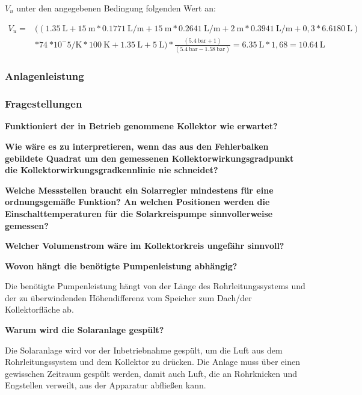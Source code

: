$V_u$ unter den angegebenen Bedingung folgenden Wert an:


\begin{equation}
	\label{MAG-Ber.}
	\begin{aligned}
	V_u= {} &((\SI{1,35}{\liter}+\SI{15}{\metre}*\SI{0,1771}{\liter\per\metre}+\SI{15}{\metre}*\SI{0,2641}{\liter\per\metre}+\SI{2}{\metre}*\SI{0,3941}{\liter\per\metre}+ 0,3*\SI{6,6180}{\liter})\\ &*\SI{74}{*10^-5\per\kelvin}*\SI{100}{\kelvin} + \SI{1,35}{\liter} + \SI{5}{\liter}) *\frac{(\SI{5,4}{\bar} + 1)}{(\SI{5,4}{\bar}-\SI{1,58}{\bar})}= \SI{6,35}{\liter} * 1,68 = \SI{10,64}{\liter}
	\end{aligned}
\end{equation}

\subsubsection{Anlagenleistung}

\subsubsection{Fragestellungen}

\textbf{Funktioniert der in Betrieb genommene Kollektor wie erwartet?}

\textbf{Wie wäre es zu interpretieren, wenn das aus den Fehlerbalken gebildete Quadrat
	um den gemessenen Kollektorwirkungsgradpunkt die Kollektorwirkungsgradkennlinie nie
	schneidet?}

\textbf{Welche Messstellen braucht ein Solarregler mindestens für eine ordnungsgemäße
	Funktion? An welchen Positionen werden die Einschalttemperaturen für die Solarkreispumpe
	sinnvollerweise gemessen?}

\textbf{Welcher Volumenstrom wäre im Kollektorkreis ungefähr sinnvoll?}

\textbf{Wovon hängt die benötigte Pumpenleistung abhängig?}

Die benötigte Pumpenleistung hängt von der Länge des Rohrleitungssystems und der zu überwindenden Höhendifferenz vom Speicher zum Dach/der Kollektorfläche ab. 

\textbf{Warum wird die Solaranlage gespült?}

Die Solaranlage wird vor der Inbetriebnahme gespült, um die Luft aus dem Rohrleitungssystem und dem Kollektor zu drücken. Die Anlage muss über einen gewisschen Zeitraum gespült werden, damit auch Luft, die an Rohrknicken und Engstellen verweilt, aus der Apparatur abfließen kann.

